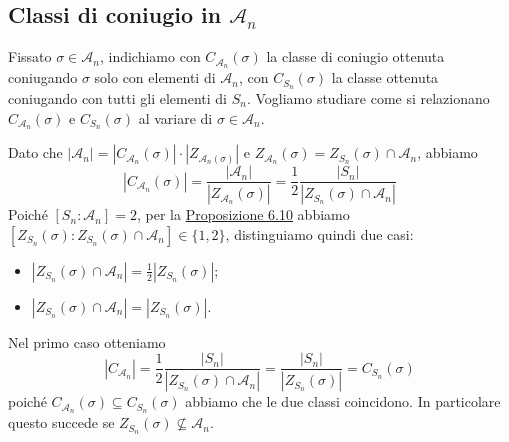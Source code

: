 \documentclass[11pt]{scrartcl}
\begin{document}
\subsection{Classi di coniugio in $\mathcal{A}_n$}

Fissato $\sigma \in \mathcal{A}_n$, indichiamo con $C_{\mathcal{A}_n}(\sigma)$ la classe di
coniugio ottenuta coniugando $\sigma$ solo con elementi di $\mathcal{A}_n$, 
con $C_{S_n}(\sigma)$ la classe ottenuta coniugando con tutti gli elementi
di $S_n$. Vogliamo studiare come si relazionano $C_{\mathcal{A}_n}(\sigma)$
e $C_{S_n}(\sigma)$ al variare di $\sigma \in \mathcal{A}_n$.

Dato che $|\mathcal{A}_n| = |C_{\mathcal{A}_n}(\sigma)|\cdot |Z_{\mathcal{A}_n(\sigma)}|$
e $Z_{\mathcal{A}_n}(\sigma) = Z_{S_n}(\sigma) \cap \mathcal{A}_n$, abbiamo
\[
    |C_{\mathcal{A}_n}(\sigma)| = \frac{|\mathcal{A}_n|}{|Z_{\mathcal{A}_n}(\sigma)|} =
    \frac 1 2 \frac{|S_n|}{|Z_{S_n}(\sigma) \cap \mathcal{A}_n|}
\]
Poiché $[S_n:\mathcal{A}_n] = 2$, per la \hyperref[prop2.0]{Proposizione 6.10}
abbiamo $[Z_{S_n}(\sigma):Z_{S_n}(\sigma) \cap \mathcal{A}_n] \in \{1, 2\}$,
distinguiamo quindi due casi:
\begin{itemize}
    \item $|Z_{S_n}(\sigma) \cap \mathcal{A}_n| = \displaystyle\frac 1 2 |Z_{S_n}(\sigma)|$;
    \item $|Z_{S_n}(\sigma) \cap \mathcal{A}_n| = |Z_{S_n}(\sigma)|$.
\end{itemize}

Nel primo caso otteniamo 
\[
    |C_{\mathcal{A}_n}| = \frac 1 2 \frac{|S_n|}{|Z_{S_n}(\sigma) \cap \mathcal{A}_n|} =
    \frac{|S_n|}{|Z_{S_n}(\sigma)|} = C_{S_n}(\sigma)
\]
poiché $C_{\mathcal{A}_n}(\sigma)\subseteq C_{S_n}(\sigma)$ abbiamo che le
due classi coincidono. In particolare questo succede se $Z_{S_n}(\sigma)
\nsubseteq \mathcal{A}_n$.
\end{document}
